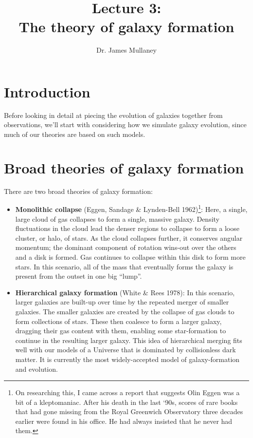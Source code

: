 \documentclass[11pt]{article}
\begin{document}
 
\title{Lecture 3:\\The theory of galaxy formation}
\author{Dr. James Mullaney}
\maketitle

\section{Introduction}
Before looking in detail at piecing the evolution of galaxies together
from observations, we'll start with considering how we simulate galaxy
evolution, since much of our theories are based on such models.

\section{Broad theories of galaxy formation}
There are two broad theories of galaxy formation:
\begin{itemize}
\item {\bf Monolithic collapse} (Eggen, Sandage \& Lynden-Bell
  1962)\footnote{On researching this, I came across a report that
    suggests Olin Eggen was a bit of a kleptomaniac. After his death
    in the last `90s, scores of rare books that had gone missing from
    the Royal Greenwich Observatory three decades earlier were found
    in his office. He had always insisted that he never had them.}:
  Here, a single, large cloud of gas collapses to form a single,
  massive galaxy. Density fluctuations in the cloud lead the denser
  regions to collapse to form a loose cluster, or halo, of stars. As
  the cloud collapses further, it conserves angular momentum; the
  dominant component of rotation wins-out over the others and a disk
  is formed. Gas continues to collapse within this disk to form
  more stars. In this scenario, all of the mass that eventually forms the
  galaxy is present from the outset in one big ``lump''.
\item {\bf Hierarchical galaxy formation} (White \& Rees 1978): In
  this scenario, larger galaxies are built-up over time by the
  repeated merger of smaller galaxies. The smaller galaxies are
  created by the collapse of gas clouds to form collections of
  stars. These then coalesce to form a larger galaxy, dragging their
  gas content with them, enabling some star-formation to continue in
  the resulting larger galaxy. This idea of hierarchical merging fits
  well with our models of a Universe that is dominated by
  collisionless dark matter. It is currently the most widely-accepted
  model of galaxy-formation and evolution.
\end{itemize}
\end{document}
